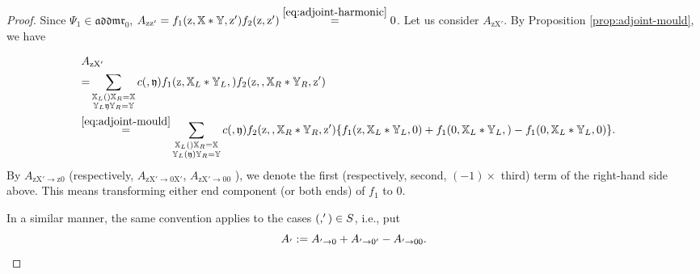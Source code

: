 \documentclass[15pt,oneside,reqno]{amsart}
\theoremstyle{remark}{
\newtheorem{lem}[df]{Lemma}
\newtheorem{prop}[df]{Proposition}
\newtheorem{ex}[df]{Example}
\newtheorem{rmk}[df]{Remark}
}
\newcommand{\ide}[1]{\mathfrak{#1}}
\newcommand{\addmr}{\mathfrak{addmr}}
\let\x\relax
\newcommand{\x}{\mathrm{x}}
\newcommand{\z}{\mathrm{z}}
\newcommand{\X}{\mathrm{X}}
\let\V\relax
\newcommand{\V}{\mathrm{V}}
\begin{document}
\begin{proof}
Since $\Psi_1 \in \addmr_0$, $A_{\z\z'} =  f_1(\z, \mathbb{X} * \mathbb{Y},\z')f_2(\z,\z') \stackrel{\eqref{eq:adjoint-harmonic}}{=} 0$.
Let us consider $A_{\z\X'}$.
By Proposition \ref{prop:adjoint-mould}, we have

\begin{align*}
&A_{\z\X'} \\
&\begin{aligned}
=& \sum_{\substack{\mathbb{X}_L (\x) \mathbb{X}_R = \mathbb{X} \\  \mathbb{Y}_L\ide{y} \mathbb{Y}_R = \mathbb{Y}}}
c(\x,\ide{y}) f_1(\z,\mathbb{X}_L * \mathbb{Y}_L, \x)f_2(\z,\x,\mathbb{X}_R * \mathbb{Y}_R,\z')
\end{aligned}\\
&\begin{aligned}
\stackrel{\eqref{eq:adjoint-mould}}{=}& \sum_{\substack{\mathbb{X}_L (\x) \mathbb{X}_R = \mathbb{X} \\  \mathbb{Y}_L(\ide{y}) \mathbb{Y}_R = \mathbb{Y}}}
c(\x,\ide{y})f_2(\z,\x,\mathbb{X}_R * \mathbb{Y}_R,\z')\{ f_1(\z,\mathbb{X}_L * \mathbb{Y}_L, 0) +  f_1(0,\mathbb{X}_L * \mathbb{Y}_L, \x) -  f_1(0,\mathbb{X}_L * \mathbb{Y}_L, 0)  \}.
\end{aligned}
\end{align*}
By $A_{\z\X'\rightarrow \z0}$ (respectively, $A_{\z\X'\rightarrow 0\X'}$, $A_{\z\X'\rightarrow 00}$ ), we denote the first (respectively, second, $(-1) \times $ third) term of the right-hand side above. This means transforming either end component (or both ends) of $f_1$ to $0$.

In a similar manner,  the same convention applies to the cases $(\V,\V') \in S$, i.e., put
\[
A_{\V\V'} := A_{\V\V'\to \V 0}+A_{\V\V'\to 0\V'}-A_{\V\V'\to 00}.
\]







\end{proof}
\end{document}
